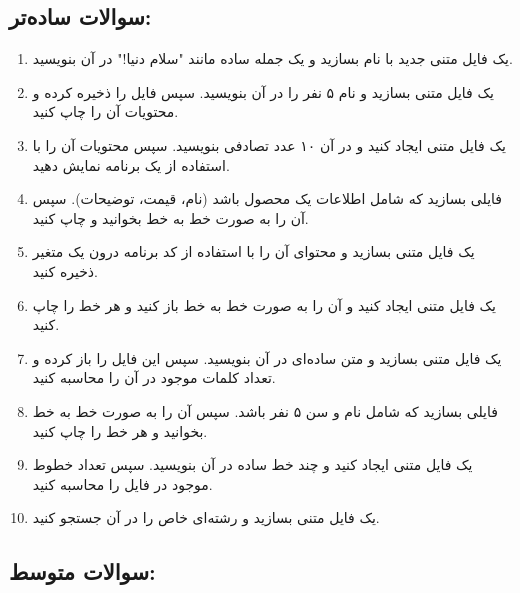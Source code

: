 \documentclass[b5paper,12pt]{article}
\begin{document}
	\subsection*{سوالات ساده‌تر:}
	
	\begin{enumerate}
		\item یک فایل متنی جدید با نام  بسازید و یک جمله ساده مانند "سلام دنیا!" در آن بنویسید.
		\item یک فایل متنی بسازید و نام ۵ نفر را در آن بنویسید. سپس فایل را ذخیره کرده و محتویات آن را چاپ کنید.
		\item یک فایل متنی ایجاد کنید و در آن ۱۰ عدد تصادفی بنویسید. سپس محتویات آن را با استفاده از یک برنامه نمایش دهید.
		\item فایلی بسازید که شامل اطلاعات یک محصول باشد (نام، قیمت، توضیحات). سپس آن را به صورت خط به خط بخوانید و چاپ کنید.
		\item یک فایل متنی بسازید و محتوای آن را با استفاده از کد برنامه درون یک متغیر ذخیره کنید.
		\item یک فایل متنی ایجاد کنید و آن را به صورت خط به خط باز کنید و هر خط را چاپ کنید.
		\item یک فایل متنی بسازید و متن ساده‌ای در آن بنویسید. سپس این فایل را باز کرده و تعداد کلمات موجود در آن را محاسبه کنید.
		\item فایلی بسازید که شامل نام و سن ۵ نفر باشد. سپس آن را به صورت خط به خط بخوانید و هر خط را چاپ کنید.
		\item یک فایل متنی ایجاد کنید و چند خط ساده در آن بنویسید. سپس تعداد خطوط موجود در فایل را محاسبه کنید.
		\item یک فایل متنی بسازید و رشته‌ای خاص را در آن جستجو کنید.
	\end{enumerate}
	
	\subsection*{سوالات متوسط:}
	
\end{document}
